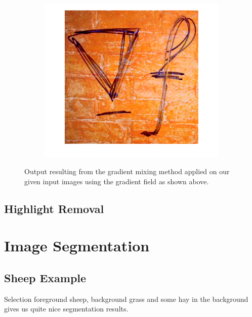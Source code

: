 \documentclass{paper}
\begin{document}
\begin{figure}[H]
    \centering
    \begin{subfigure}{1.0\textwidth}
        \includegraphics[width=\textwidth]{../../outputs/p4/gradient_mixing/output}
    \end{subfigure}
    \caption{Output resulting from the gradient mixing method applied on our given input images using the gradient field as shown above.}
    \label{fig:gradient_mixing_out}       
\end{figure}

\subsection{Highlight Removal}


\section{Image Segmentation}


\subsection{Sheep Example}

Selection foreground sheep, background grass and some hay in the background gives us quite nice segmentation results.
\end{document}
